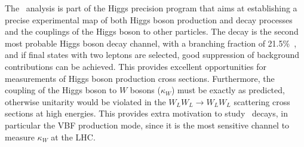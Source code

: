 The \HWW\ analysis is part of the Higgs precision program that aims at establishing a precise experimental map of both Higgs boson production and decay processes and the couplings of the Higgs boson to other particles.
The \HWW decay is the second most probable Higgs boson decay channel, with a branching fraction of 21.5\%~\cite{PDG2020}, and if final states with two leptons are selected, good suppression of background contributions can be achieved.
This provides excellent opportunities for measurements of Higgs boson production cross sections.
Furthermore, the coupling of the Higgs boson to $W$ bosons ($\kappa_W$) must be exactly as predicted, otherwise unitarity would be violated in the $W_LW_L \to W_LW_L$ scattering cross sections at high energies.
This provides extra motivation to study \HWW\ decays, in particular the VBF production mode, since it is the most sensitive channel to measure $\kappa_W$ at the LHC.


